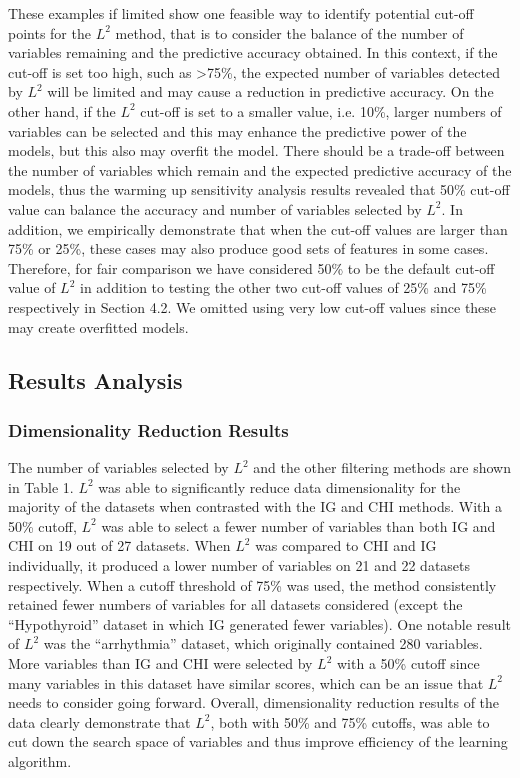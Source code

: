 \documentclass[review]{elsarticle}
\begin{document}
These examples if limited show one feasible way to identify potential cut-off points for the $ L^2 $ method, that is to consider the balance of the number of variables remaining and the predictive accuracy obtained. In this context, if the cut-off is set too high, such as >75\%, the expected number of variables detected by $ L^2 $ will be limited and may cause a reduction in predictive accuracy. On the other hand, if the $ L^2 $ cut-off is set to a smaller value, i.e. 10\%, larger numbers of variables can be selected and this may enhance the predictive power of the models, but this also may overfit the model. There should be a trade-off between the number of variables which remain and the expected predictive accuracy of the models, thus the warming up sensitivity analysis results revealed that 50\% cut-off value can balance the accuracy and number of variables selected by $ L^2 $.  In addition, we empirically demonstrate that when the cut-off values are larger than 75\% or 25\%, these cases may also produce good sets of features in some cases. Therefore, for fair comparison we have considered 50\% to be the default cut-off value of  $ L^2 $ in addition to testing the other two cut-off values of 25\% and 75\% respectively in Section 4.2. We omitted using very low cut-off values since these may create overfitted models. 

\subsection{Results Analysis }

\subsubsection{Dimensionality Reduction Results }

The number of variables selected by $ L^2 $ and the other filtering methods are shown in Table 1. $ L^2 $ was able to significantly reduce data dimensionality for the majority of the datasets when contrasted with the IG and CHI methods. With a 50\% cutoff, $ L^2 $ was able to select a fewer number of variables than both IG and CHI on 19 out of 27 datasets. When $ L^2 $ was compared to CHI and IG individually, it produced a lower number of variables on 21 and 22 datasets respectively. When a cutoff threshold of 75\% was used, the method consistently retained fewer numbers of variables for all datasets considered (except the “Hypothyroid” dataset in which IG generated fewer variables). One notable result of $ L^2 $ was the “arrhythmia” dataset, which originally contained 280 variables. More variables than IG and CHI were selected by $ L^2 $ with a 50\% cutoff since many variables in this dataset have similar scores, which can be an issue that $ L^2 $ needs to consider going forward. Overall, dimensionality reduction results of the data clearly demonstrate that $ L^2 $, both with 50\% and 75\% cutoffs, was able to cut down the search space of variables and thus improve efficiency of the learning algorithm.
\end{document}
